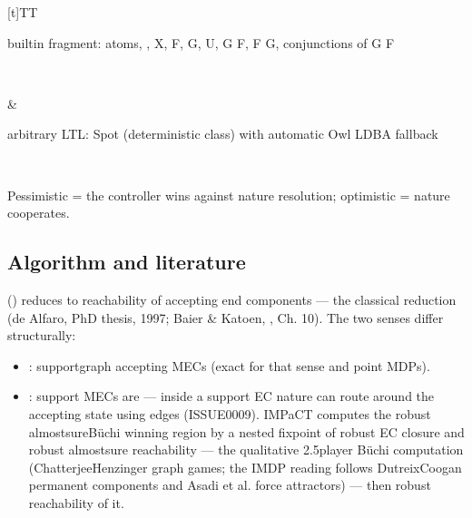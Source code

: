 \documentclass[a4paper,10pt,english]{sphinxmanual}
\begin{document}
\begin{savenotes}
\begin{tabulary}{\linewidth}[t]{TT}
\begin{varwidth}[t]{}
\sphinxAtStartPar
built\sphinxhyphen{}in fragment: atoms, \sphinxcode{\sphinxupquote{! \& | \sphinxhyphen{}\textgreater{}}}, X, F, G, U, G F, F G, conjunctions of G F
\sphinxbeforeendvarwidth
\end{varwidth}%
\\
\sphinxhline\begin{varwidth}[t]{}
\sphinxAtStartPar
{}
\sphinxbeforeendvarwidth
\end{varwidth}%
&\begin{varwidth}[t]{}
\sphinxAtStartPar
arbitrary LTL: Spot (deterministic class) with automatic Owl LDBA fallback
\sphinxbeforeendvarwidth
\end{varwidth}%
\\
\sphinxbottomrule
\end{tabulary}
\sphinxtableafterendhook\par
\sphinxattableend\end{savenotes}

\sphinxAtStartPar
Pessimistic = the controller wins against  nature resolution; optimistic =
nature cooperates.


\subsection{Algorithm and literature}
\label{\detokenize{manual/omega-ltl:algorithm-and-literature}}
\sphinxAtStartPar
{} () reduces to reachability of accepting end components — the
classical reduction (de Alfaro, PhD thesis, 1997; Baier \& Katoen, , Ch. 10). The two senses differ structurally:
\begin{itemize}
\item {} 
\sphinxAtStartPar
{}: support\sphinxhyphen{}graph accepting MECs (exact for that sense and point MDPs).

\item {} 
\sphinxAtStartPar
{}: support MECs are  — inside a support EC nature can
route around the accepting state using  edges (ISSUE\sphinxhyphen{}0009). IMPaCT computes the
robust almost\sphinxhyphen{}sure\sphinxhyphen{}Büchi winning region by a nested fixpoint of robust EC closure and
robust almost\sphinxhyphen{}sure reachability — the qualitative 2.5\sphinxhyphen{}player Büchi computation
(Chatterjee\sphinxhyphen{}Henzinger graph games; the IMDP reading follows Dutreix\sphinxhyphen{}Coogan permanent
components and Asadi et al. force attractors) — then robust reachability of it.

\end{itemize}
\end{document}
